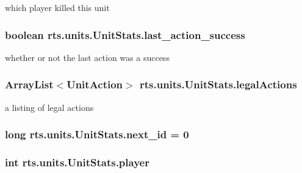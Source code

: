 \label{classrts_1_1units_1_1_unit_stats_a7c136510fe6631fcfd9bd246698328d3}
which player killed this unit \hypertarget{classrts_1_1units_1_1_unit_stats_aab4f4e1828b46c575053ff22372ac6ed}{
\subsubsection[{last\_\-action\_\-success}]{\setlength{\rightskip}{0pt plus 5cm}boolean {\bf rts.units.UnitStats.last\_\-action\_\-success}}}
\label{classrts_1_1units_1_1_unit_stats_aab4f4e1828b46c575053ff22372ac6ed}
whether or not the last action was a success \hypertarget{classrts_1_1units_1_1_unit_stats_a5b8dcaea735d6fe1b55120355a679809}{
\subsubsection[{legalActions}]{\setlength{\rightskip}{0pt plus 5cm}ArrayList$<${\bf UnitAction}$>$ {\bf rts.units.UnitStats.legalActions}}}
\label{classrts_1_1units_1_1_unit_stats_a5b8dcaea735d6fe1b55120355a679809}
a listing of legal actions \hypertarget{classrts_1_1units_1_1_unit_stats_a80ab0040be7e369e4572ed223942cd57}{
\subsubsection[{next\_\-id}]{\setlength{\rightskip}{0pt plus 5cm}long {\bf rts.units.UnitStats.next\_\-id} = 0}}
\label{classrts_1_1units_1_1_unit_stats_a80ab0040be7e369e4572ed223942cd57}
\hypertarget{classrts_1_1units_1_1_unit_stats_a9f6197b668783aae1b851f6a5910802f}{
\subsubsection[{player}]{\setlength{\rightskip}{0pt plus 5cm}int {\bf rts.units.UnitStats.player}}}
